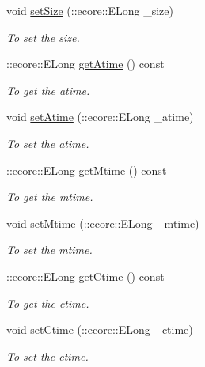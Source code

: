 \begin{DoxyCompactItemize}
void \hyperlink{classFMS__Data_1_1FileStat_a3291f7d5d2a9b129361fea7668f7980f}{setSize} (::ecore::ELong \_\-size)
\begin{DoxyCompactList}\small\item\em To set the size. \item\end{DoxyCompactList}\item 
::ecore::ELong \hyperlink{classFMS__Data_1_1FileStat_a001bf944d2a672e84cfe33a9762067ff}{getAtime} () const 
\begin{DoxyCompactList}\small\item\em To get the atime. \item\end{DoxyCompactList}\item 
void \hyperlink{classFMS__Data_1_1FileStat_a36a8768f288076d291208b5bc7315190}{setAtime} (::ecore::ELong \_\-atime)
\begin{DoxyCompactList}\small\item\em To set the atime. \item\end{DoxyCompactList}\item 
::ecore::ELong \hyperlink{classFMS__Data_1_1FileStat_a8f629774ef9abd39c14f5aec490cf8a3}{getMtime} () const 
\begin{DoxyCompactList}\small\item\em To get the mtime. \item\end{DoxyCompactList}\item 
void \hyperlink{classFMS__Data_1_1FileStat_adc2e8adf9f90932d39a8a0f2232248a0}{setMtime} (::ecore::ELong \_\-mtime)
\begin{DoxyCompactList}\small\item\em To set the mtime. \item\end{DoxyCompactList}\item 
::ecore::ELong \hyperlink{classFMS__Data_1_1FileStat_aed031d7f73a34b3569740f7b33382592}{getCtime} () const 
\begin{DoxyCompactList}\small\item\em To get the ctime. \item\end{DoxyCompactList}\item 
void \hyperlink{classFMS__Data_1_1FileStat_aaa4d54921267dffde28cbef4cde9427e}{setCtime} (::ecore::ELong \_\-ctime)
\begin{DoxyCompactList}\small\item\em To set the ctime. \item\end{DoxyCompactList}\item 

\end{DoxyCompactItemize}
